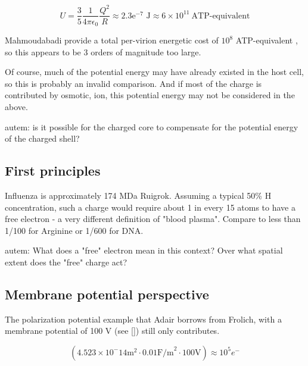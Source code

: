 \documentclass[paper.tex]{subfiles}
\begin{document}

$$ U = \frac{3}{5}  \frac{1}{4 \pi \epsilon_0} \frac{Q^2}{R} \approx 2.3\text{e}^{-7} \text{ J} \approx 6 \times 10^{11}\  \text{ATP-equivalent} $$



Mahmoudabadi\cite{Energetic2017} provide a total per-virion energetic cost of $10^8 $ ATP-equivalent , so this appears to be 3 orders of magnitude too large.

Of course, much of the potential energy may have already existed in the host cell, so this is probably an invalid comparison. And if most of the charge is contributed by osmotic, ion, this potential energy may not be considered in the above. 

\begin{autem}
	autem: is it possible for the charged core to compensate for the potential energy of the charged shell?
\end{autem}

\subsection{First principles}

Influenza is approximately 174 MDa Ruigrok. Assuming a typical 50\% H concentration, such a charge would require about 1 in every 15 atoms to have a free electron - a very different definition of "blood plasma". Compare to less than 1/100 for Arginine or 1/600 for DNA. 

\begin{autem}
	autem: What does a "free" electron mean in this context? Over what spatial extent does the "free" charge act?
\end{autem}

\subsection{Membrane potential perspective}


The polarization potential example that Adair borrows from Frolich, with a membrane potential of 100 V (see []) still only contributes.  

$$(4.523 \times 10^-14 \text{m}^2 \cdot 0.01 \text{F/m}^2 \cdot 100 \text{V}) \approx 10^5 e^- $$
\end{document}
